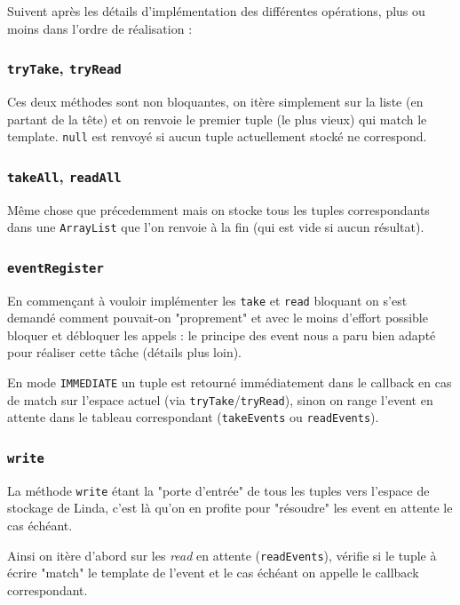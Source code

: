 \documentclass[headings=standardclasses,parskip=half]{scrartcl}
\begin{document}
Suivent après les détails d'implémentation des différentes opérations,
plus ou moins dans l'ordre de réalisation :

\subsubsection{\texttt{tryTake}, \texttt{tryRead}}

Ces deux méthodes sont non bloquantes, on itère simplement sur la liste
(en partant de la tête) et on renvoie le premier tuple (le plus vieux)
qui match le template. \texttt{null} est renvoyé si aucun tuple
actuellement stocké ne correspond.

\subsubsection{\texttt{takeAll}, \texttt{readAll}}

Même chose que précedemment mais on stocke tous les tuples correspondants
dans une \texttt{ArrayList} que l'on renvoie à la fin (qui est vide
si aucun résultat).

\subsubsection{\texttt{eventRegister}}

En commençant à vouloir implémenter les \texttt{take} et \texttt{read}
bloquant on s'est demandé comment pouvait-on "proprement" et avec le
moins d'effort possible bloquer et débloquer les appels : le principe
des event nous a paru bien adapté pour réaliser cette tâche
(détails plus loin).

En mode \texttt{IMMEDIATE} un tuple est retourné immédiatement dans
le callback en cas de match sur l'espace actuel
(via \texttt{tryTake}/\texttt{tryRead}),
sinon on range l'event en attente dans le tableau correspondant
(\texttt{takeEvents} ou \texttt{readEvents}).

\subsubsection{\texttt{write}}

La méthode \texttt{write} étant la "porte d'entrée" de tous les tuples
vers l'espace de stockage de Linda, c'est là qu'on en profite pour
"résoudre" les event en attente le cas échéant.

Ainsi on itère d'abord sur les \emph{read} en attente (\texttt{readEvents}),
vérifie si le tuple à écrire "match" le template de l'event et le cas
échéant on appelle le callback correspondant.
\end{document}
